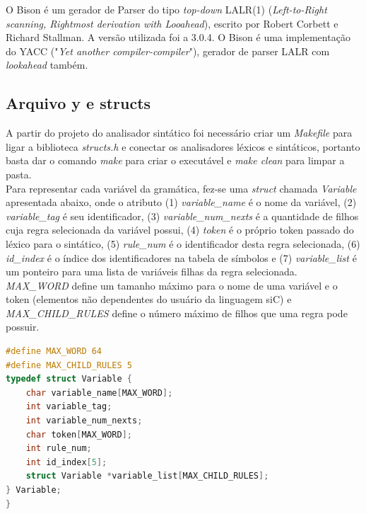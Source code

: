 \documentclass[12pt]{article}
\begin{document}
\indent O Bison é um gerador de Parser do tipo \textit{top-down} LALR(1) (\textit{Left-to-Right scanning, Rightmost derivation with Looahead}), escrito por Robert Corbett e Richard Stallman. A versão utilizada foi a 3.0.4. O Bison é uma implementação do YACC ("\textit{Yet another compiler-compiler}"), gerador de parser LALR com \textit{lookahead} também.

\subsection{Arquivo y e structs}

\indent A partir do projeto do analisador sintático foi necessário criar um \textit{Makefile} para ligar a biblioteca \textit{structs.h} e conectar os analisadores léxicos e sintáticos, portanto basta dar o comando \textit{make} para criar o executável e \textit{make clean} para limpar a pasta. \\
\indent Para representar cada variável da gramática, fez-se uma \textit{struct} chamada \textit{Variable} apresentada abaixo, onde o atributo (1) \textit{variable\_name} é o nome da variável, (2) \textit{variable\_tag} é seu identificador, (3) \textit{variable\_num\_nexts} é a quantidade de filhos cuja regra selecionada da variável possui, (4) \textit{token} é o próprio token passado do léxico para o sintático, (5) \textit{rule\_num} é o identificador desta regra selecionada, (6) \textit{id\_index} é o índice dos identificadores na tabela de símbolos e  (7) \textit{variable\_list} é um ponteiro para uma lista de variáveis filhas da regra selecionada. \textit{MAX\_WORD} define um tamanho máximo para o nome de uma variável e o token (elementos não dependentes do usuário da linguagem siC) e \textit{MAX\_CHILD\_RULES} define o número máximo de filhos que uma regra pode possuir. \\
\begin{lstlisting}[language=C]
#define MAX_WORD 64
#define MAX_CHILD_RULES 5
typedef struct Variable {
    char variable_name[MAX_WORD];
    int variable_tag;
    int variable_num_nexts;
    char token[MAX_WORD];
    int rule_num;
    int id_index[5];
    struct Variable *variable_list[MAX_CHILD_RULES];
} Variable;
}
\end{lstlisting}
\end{document}
